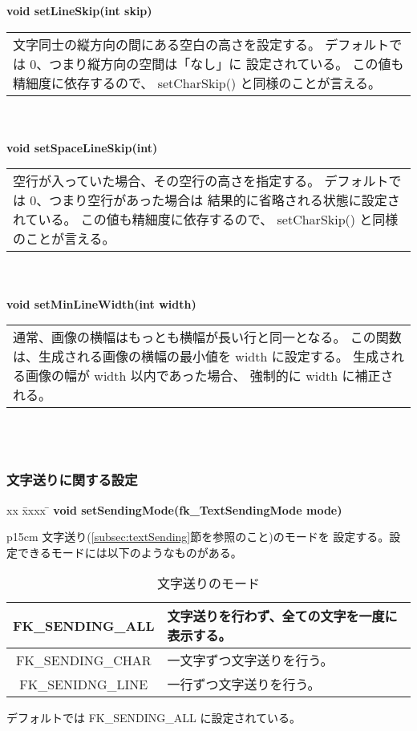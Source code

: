 \begin{tabbing}
\> \textbf{void setLineSkip(int skip)} \\
	\> \> \begin{tabular}{p{15cm}}
		文字同士の縦方向の間にある空白の高さを設定する。
		デフォルトでは 0、つまり縦方向の空間は「なし」に
		設定されている。
		この値も精細度に依存するので、
		setCharSkip() と同様のことが言える。
	\end{tabular} \\ \\

\> \textbf{void setSpaceLineSkip(int)} \\
	\> \> \begin{tabular}{p{15cm}}
		空行が入っていた場合、その空行の高さを指定する。
		デフォルトでは 0、つまり空行があった場合は
		結果的に省略される状態に設定されている。
		この値も精細度に依存するので、
		setCharSkip() と同様のことが言える。
	\end{tabular} \\ \\

\> \textbf{void setMinLineWidth(int width)} \\
	\> \> \begin{tabular}{p{15cm}}
		通常、画像の横幅はもっとも横幅が長い行と同一となる。
		この関数は、生成される画像の横幅の最小値を width に設定する。
		生成される画像の幅が width 以内であった場合、
		強制的に width に補正される。
	\end{tabular} \\ \\
\end{tabbing}

\subsubsection{文字送りに関する設定} \label{subsubsec:sendRef}
\begin{tabbing}
xx \= xxxx \= \kill
\> \textbf{void setSendingMode(fk\_TextSendingMode mode)} \\
	\> \> \begin{tabular}{p{15cm}}
		文字送り(\ref{subsec:textSending}節を参照のこと)のモードを
		設定する。設定できるモードには以下のようなものがある。
			\begin{table}[H]
			\caption{文字送りのモード}
			\label{tbl:textSending}
			\begin{center}
			\begin{tabular}{|c|l|}
			\hline
			FK\_SENDING\_ALL &
			文字送りを行わず、全ての文字を一度に表示する。
			\\ \hline
			FK\_SENDING\_CHAR &
			一文字ずつ文字送りを行う。\\ \hline
			FK\_SENIDNG\_LINE &
			一行ずつ文字送りを行う。\\ \hline
			\end{tabular}
			\end{center}
			\end{table}
		デフォルトでは FK\_SENDING\_ALL に設定されている。
	\end{tabular}
\end{tabbing}

